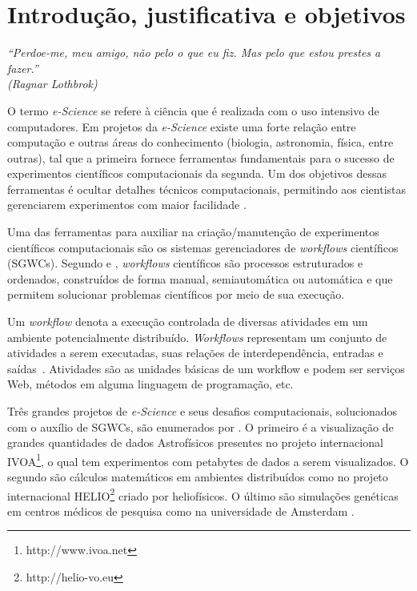 \chapter{Introdu\c{c}{\~a}o, justificativa e objetivos}\label{INTRODUCAO}
\begin{flushright}
	\textit{``Perdoe-me, meu amigo, não pelo o que eu fiz. Mas pelo que estou prestes a fazer.''\\
	(Ragnar Lothbrok)}
\end{flushright}

O termo \emph{e-Science} se refere à ciência que é realizada com o uso intensivo de computadores. Em projetos da \emph{e-Science} existe uma forte relação entre computação e outras áreas do conhecimento (biologia, astronomia, física, entre outras), tal que a primeira fornece ferramentas fundamentais para o sucesso de experimentos científicos computacionais da segunda. Um dos objetivos dessas ferramentas é ocultar detalhes técnicos computacionais, permitindo aos cientistas gerenciarem experimentos com maior facilidade \cite{Deelman2009}.

Uma das ferramentas para auxiliar na criação/manutenção de experimentos científicos computacionais são os sistemas gerenciadores de \emph{workflows} científicos (SGWCs). Segundo  e , \emph{workflows} científicos são processos estruturados e ordenados, construídos de forma manual, semiautomática ou automática e que permitem solucionar problemas científicos por meio de sua execução.

Um \emph{workflow} denota a execução controlada de diversas atividades em um ambiente potencialmente distribuído. \emph{Workflows} representam um conjunto de atividades a serem executadas, suas relações de interdependência, entradas e saídas~\cite{Medeiros2005}. Atividades são as unidades básicas de um workflow e podem ser serviços Web, métodos em alguma linguagem de programação, etc.

Três grandes projetos de \emph{e-Science} e seus desafios computacionais, solucionados com o auxílio de SGWCs, são enumerados por . O primeiro é a visualização de grandes quantidades de dados Astrofísicos presentes no projeto internacional IVOA\footnote{http://www.ivoa.net}, o qual tem experimentos com petabytes de dados a serem visualizados. O segundo são cálculos matemáticos em ambientes distribuídos como no projeto internacional HELIO\footnote{http://helio-vo.eu} criado por heliofísicos. O último são simulações genéticas em centros médicos de pesquisa como na universidade de Amsterdam \cite{Olabarriaga2014}.

